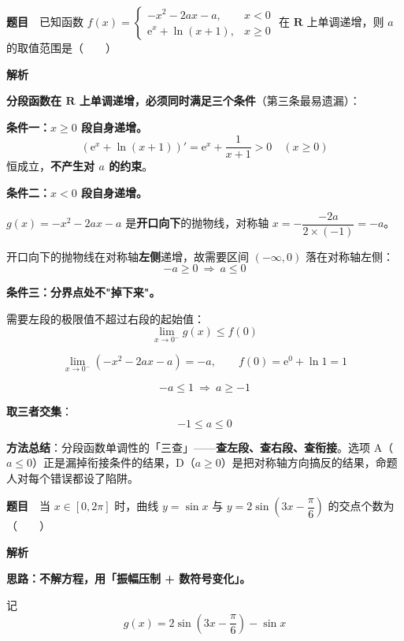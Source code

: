 \par\medskip


\textbf{题目}　已知函数 $f(x)=\begin{cases}-x^{2}-2ax-a,&x<0\\ \mathrm e^{x}+\ln(x+1),&x\ge0\end{cases}$ 在 $\mathbf R$ 上单调递增，则 $a$ 的取值范围是（　　）

\textbf{解析}

\textbf{分段函数在 $\mathbf R$ 上单调递增，必须同时满足三个条件}（第三条最易遗漏）：

\textbf{条件一：$x\ge0$ 段自身递增。}
\[\left(\mathrm e^{x}+\ln(x+1)\right)'=\mathrm e^{x}+\frac1{x+1}>0\quad(x\ge0)\]
恒成立，\textbf{不产生对 $a$ 的约束}。

\textbf{条件二：$x<0$ 段自身递增。}

$g(x)=-x^{2}-2ax-a$ 是\textbf{开口向下}的抛物线，对称轴 $x=-\dfrac{-2a}{2\times(-1)}=-a$。

开口向下的抛物线在对称轴\textbf{左侧}递增，故需要区间 $(-\infty,0)$ 落在对称轴左侧：
\[-a\ge0\ \Longrightarrow\ a\le0\]

\textbf{条件三：分界点处不"掉下来"。}

需要左段的极限值不超过右段的起始值：
\[\lim_{x\to0^{-}}g(x)\le f(0)\]

\[\lim_{x\to0^{-}}\left(-x^{2}-2ax-a\right)=-a,\qquad f(0)=\mathrm e^{0}+\ln1=1\]

\[-a\le1\ \Longrightarrow\ a\ge-1\]

\textbf{取三者交集}：
\[-1\le a\le0\]


\begin{gktip}
\textbf{方法总结}：分段函数单调性的「三查」——\textbf{查左段、查右段、查衔接}。选项 A（$a\le0$）正是漏掉衔接条件的结果，D（$a\ge0$）是把对称轴方向搞反的结果，命题人对每个错误都设了陷阱。
\end{gktip}

\par\medskip


\textbf{题目}　当 $x\in[0,2\pi]$ 时，曲线 $y=\sin x$ 与 $y=2\sin\left(3x-\dfrac\pi6\right)$ 的交点个数为（　　）

\textbf{解析}

\textbf{思路：不解方程，用「振幅压制 + 数符号变化」。}

记
\[g(x)=2\sin\left(3x-\frac\pi6\right)-\sin x\]

